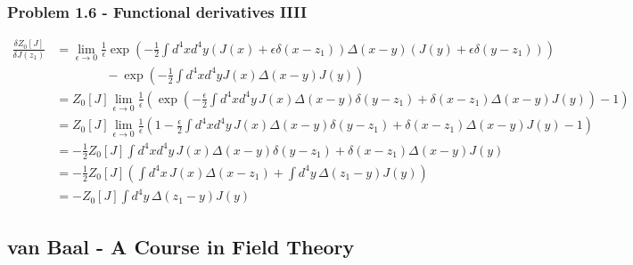 \documentclass[10pt,a4paper]{book}
\theoremstyle{definition}
\begin{document}
\subsubsection{Problem 1.6 - Functional derivatives IIII}
\begin{align}
\frac{\delta Z_0[J]}{\delta J(z_1)}
&=\lim_{\epsilon\rightarrow0}\frac{1}{\epsilon}\exp\left(-\frac{1}{2}\int d^4xd^4y(J(x)+\epsilon\delta(x-z_1))\Delta(x-y)(J(y)+\epsilon\delta(y-z_1))\right)\\
&\qquad\qquad-\exp\left(-\frac{1}{2}\int d^4xd^4yJ(x)\Delta(x-y)J(y)\right)\\
&=Z_0[J]\lim_{\epsilon\rightarrow0}\frac{1}{\epsilon}\left(\exp\left(-\frac{\epsilon}{2}\int d^4xd^4y\, J(x)\Delta(x-y)\delta(y-z_1)+\delta(x-z_1)\Delta(x-y)J(y)\right)-1\right)\\
&=Z_0[J]\lim_{\epsilon\rightarrow0}\frac{1}{\epsilon}\left(1-\frac{\epsilon}{2}\int d^4xd^4y\, J(x)\Delta(x-y)\delta(y-z_1)+\delta(x-z_1)\Delta(x-y)J(y)-1\right)\\
&=-\frac{1}{2}Z_0[J]\int d^4xd^4y\, J(x)\Delta(x-y)\delta(y-z_1)+\delta(x-z_1)\Delta(x-y)J(y)\\
&=-\frac{1}{2}Z_0[J]\left(\int d^4x\, J(x)\Delta(x-z_1)+\int d^4y\,\Delta(z_1-y)J(y)\right)\\
&=-Z_0[J]\int d^4y\,\Delta(z_1-y)J(y)
\end{align}



\subsection{{\sc van Baal} - A Course in Field Theory}
\end{document}
